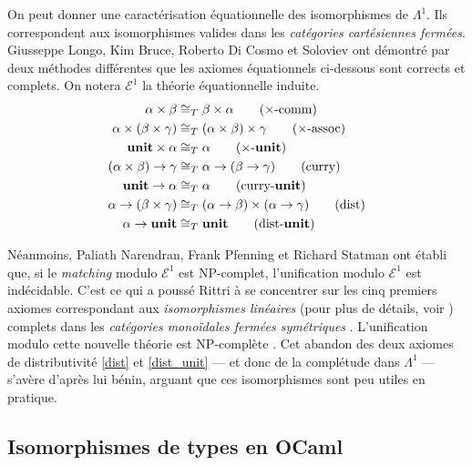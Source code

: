 \documentclass[a4paper]{report}
\theoremstyle{definition}
\newcommand{\unit}{\bold{unit}}
\newcommand{\E}{\mathscr E}
\newcommand{\Tiso}{\cong_T}
\begin{document}
On peut donner une caractérisation équationnelle des isomorphismes de $\Lambda^1$. Ils correspondent aux isomorphismes valides dans les \emph{catégories cartésiennes fermées}. Giusseppe Longo, Kim Bruce, Roberto Di Cosmo \cite{Bruce_DiCosmo_Longo} et Soloviev \cite{Soloviev83} ont démontré par deux méthodes différentes que les axiomes équationnels ci-dessous sont corrects et complets. On notera $\E^1$ la théorie équationnelle induite.
\begin{align}
		\alpha \times \beta &\Tiso
		\beta \times \alpha
		\label{prod_comm}
		\tag{$\times$-comm}
	\\
		\alpha \times (\beta \times \gamma) &\Tiso
		(\alpha \times \beta) \times \gamma
		\label{prod_assoc}
		\tag{$\times$-assoc}
	\\
		\unit \times \alpha &\Tiso
		\alpha
		\label{prod_unit}
		\tag{$\times$-$\unit$}
	\\
		(\alpha \times \beta) \rightarrow \gamma &\Tiso
		\alpha \rightarrow (\beta \rightarrow \gamma)
		\label{curry}
		\tag{curry}
	\\
		\unit \rightarrow \alpha &\Tiso
		\alpha
		\label{curry_unit}
		\tag{curry-$\unit$}
	\\
		\alpha \rightarrow (\beta \times \gamma) &\Tiso
		(\alpha \rightarrow \beta) \times (\alpha \rightarrow \gamma)
		\label{dist}
		\tag{dist}
	\\
		\alpha \rightarrow \unit &\Tiso
		\unit
		\label{dist_unit}
		\tag{dist-$\unit$}
\end{align}

Néanmoins, Paliath Narendran, Frank Pfenning et Richard Statman \cite{Narendran_Pfenning_Statman} ont établi que, si le \emph{matching} modulo $\E^1$ est NP-complet, l'unification modulo $\E^1$ est indécidable. C'est ce qui a poussé Rittri \cite{Rittri93} à se concentrer sur les cinq premiers axiomes correspondant aux \emph{isomorphismes linéaires} (pour plus de détails, voir \cite{Rittri93}) complets dans les \emph{catégories monoïdales fermées symétriques} \cite{Soloviev93}. L'unification modulo cette nouvelle théorie est NP-complète \cite{Narendran_Pfenning_Statman}. Cet abandon des deux axiomes de distributivité \eqref{dist} et \eqref{dist_unit} — et donc de la complétude dans $\Lambda^1$ — s'avère d'après lui bénin, arguant que ces isomorphismes sont peu utiles en pratique.


\subsection{Isomorphismes de types en OCaml}
\end{document}
